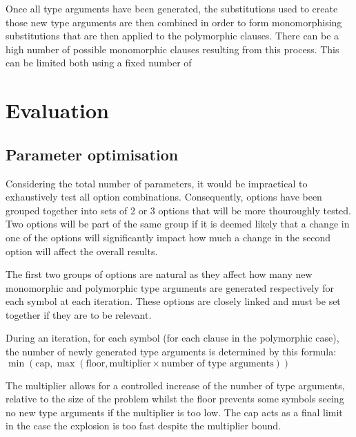\documentclass[]{ceurart}
\begin{document}
Once all type arguments have been generated, the substitutions used to create those new type arguments are then combined in order to form monomorphising substitutions that are then applied to the polymorphic clauses. There can be a high number of possible monomorphic clauses resulting from this process. This can be limited both using a fixed number of 


\section{Evaluation}
\label{sec:evaluation}


\subsection{Parameter optimisation}

Considering the total number of parameters, it would be impractical to exhaustively test all option combinations. Consequently, options have been grouped together into sets of 2 or 3 options that will be more thouroughly tested. Two options will be part of the same group if it is deemed likely that a change in one of the options will significantly impact how much a change in the second option will affect the overall results.

The first two groups of options are natural as they affect how many new monomorphic and polymorphic type arguments are generated respectively for each symbol at each iteration. These options are closely linked and must be set together if they are to be relevant.

During an iteration, for each symbol (for each clause in the polymorphic case), the number of newly generated type arguments is determined by this formula:
\( \min(\text{cap}, \max(\text{floor}, \text{multiplier} \times \text{number of type arguments})) \)

The multiplier allows for a controlled increase of the number of type arguments, relative to the size of the problem whilst the floor prevents some symbols seeing no new type arguments if the multiplier is too low.
The cap acts as a final limit in the case the explosion is too fast despite the multiplier bound.
\end{document}
